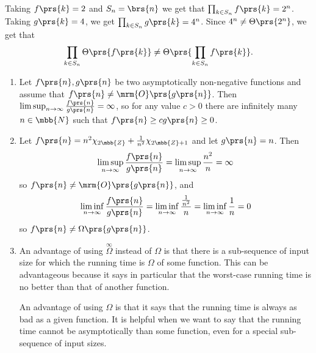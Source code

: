 \documentclass[oneside]{scrbook}
\theoremstyle{definition}
\begin{document}
\begin{problem}
\begin{enumerate}[label = \alph*.]
    Taking $f\prs{k} = 2$ and $S_n = \brs{n}$ we get that $\prod_{k \in S_n} f\prs{k} = 2^n$. Taking $g\prs{k} = 4$, we get $\prod_{k \in S_n} g\prs{k} = 4^n$. Since $4^n \neq \Theta\prs{2^n}$, we get that
    \begin{align*}
        \prod_{k \in S_n} \Theta\prs{f\prs{k}} \neq \Theta\prs{\prod_{k \in S_n} f\prs{k}} \text{.}
    \end{align*}
\end{enumerate}
\end{problem}

\begin{problem}
\begin{enumerate}[label=\alph*.]
    \item Let $f\prs{n}, g\prs{n}$ be two asymptotically non-negative functions and assume that $f\prs{n} \neq \mrm{O}\prs{g\prs{n}}$. Then $\limsup_{n\to\infty} \frac{f\prs{n}}{g\prs{n}} = \infty$, so for any value $c > 0$ there are infinitely many $n \in \mbb{N}$ such that $f\prs{n} \geq c g\prs{n} \geq 0$.

    \item Let $f\prs{n} = n^2 \chi_{2\mbb{Z}} + \frac{1}{n^2} \chi_{2\mbb{Z} + 1}$ and let $g\prs{n} = n$.
    Then
    \begin{align*}
        \limsup_{n \to \infty} \frac{f\prs{n}}{g\prs{n}} = \limsup_{n \to \infty} \frac{n^2}{n} = \infty
    \end{align*}
    so $f\prs{n} \neq \mrm{O}\prs{g\prs{n}}$,
    and
    \begin{align*}
        \liminf_{n\to\infty} \frac{f\prs{n}}{g\prs{n}} = \liminf_{n\to\infty} \frac{\frac{1}{n^2}}{n} = \liminf_{n\to\infty} \frac{1}{n} = 0
    \end{align*}
    so $f\prs{n} \neq \Omega\prs{g\prs{n}}$.

    \item An advantage of using $\stackrel{\infty}{\Omega}$ instead of $\Omega$ is that there is a sub-sequence of input size for which the running time is $\Omega$ of some function. This can be advantageous because it says in particular that the worst-case running time is no better than that of another function.

    An advantage of using $\Omega$ is that it says that the running time is always as bad as a given function. It is helpful when we want to say that the running time cannot be asymptotically than some function, even for a special sub-sequence of input sizes.


\end{enumerate}
\end{problem}
\end{document}
